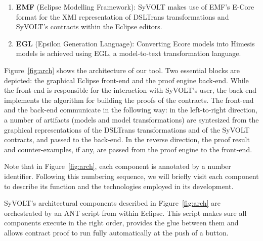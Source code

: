 \begin{enumerate}
  \item \textbf{EMF} (Eclipse Modelling Framework): SyVOLT makes
  use of EMF's E-Core format for the XMI representation of DSLTrans transformations
  and SyVOLT's contracts within the Eclipse editors.
  \item \textbf{EGL} (Epsilon Generation Language): Converting
  Ecore models into Himesis models is achieved using EGL, a
  model-to-text transformation language.
\end{enumerate}


Figure~\ref{fig:arch} shows the architecture of our tool. Two essential
blocks are depicted: the graphical Eclipse front-end and the proof engine
back-end. While the front-end is responsible for the interaction with SyVOLT's
user, the back-end implements the algorithm for building the proofs of the
contracts. The front-end and the back-end communicate in the following way:
in the left-to-right direction, a number of artifacts (models and model
transformations) are syntesized from the graphical representations of the
DSLTrans transformations and of the SyVOLT contracts, and passed to the
back-end. In the reverse direction, the proof result and counter-examples, if
any, are passed from the proof engine to the front-end.

Note that in Figure~\ref{fig:arch}, each component is annotated by a number
identifier. Following this numbering sequence, we will briefly visit each
component to describe its function and the technologies employed in its development.

SyVOLT's architectural components described in Figure~\ref{fig:arch} are
orchestrated by an ANT script from within Eclipse. This script makes sure all components execute in the
right order, provides the glue between them and allows contract proof to run
fully automatically at the push of a button.

